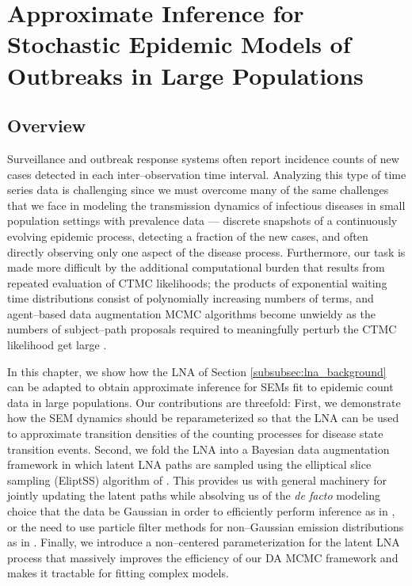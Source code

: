 \chapter{Approximate Inference for Stochastic Epidemic Models of Outbreaks in Large Populations}
\label{chap:lna_for_sems}

\section{Overview}
\label{sec:lna_overview}

Surveillance and outbreak response systems often report incidence counts of new cases detected in each inter--observation time interval. Analyzing this type of time series data is challenging since we must overcome many of the same challenges that we face in modeling the transmission dynamics of infectious diseases in small population settings with prevalence data --- discrete snapshots of a continuously evolving epidemic process, detecting a fraction of the new cases, and often directly observing only one aspect of the disease process. Furthermore, our task is made more difficult by the additional computational burden that results from repeated evaluation of CTMC likelihoods; the products of exponential waiting time distributions consist of polynomially increasing numbers of terms, and agent--based data augmentation MCMC algorithms become unwieldy as the numbers of subject--path proposals required to meaningfully perturb the CTMC likelihood get large \citep{fintzi2017efficient}. 

In this chapter, we show how the LNA of Section \ref{subsubsec:lna_background} can be adapted to obtain approximate inference for SEMs fit to epidemic count data in large populations. Our contributions are threefold: First, we demonstrate how the SEM dynamics should be reparameterized so that the LNA can be used to approximate transition densities of the counting processes for disease state transition events. Second, we fold the LNA into a Bayesian data augmentation framework in which latent LNA paths are sampled using the elliptical slice sampling (EliptSS) algorithm of \cite{murray2010}. This provides us with general machinery for jointly updating the latent paths while absolving us of the \textit{de facto} modeling choice that the data be Gaussian in order to efficiently perform inference as in \cite{komorowski2009,fearnhead2014}, or the need to use particle filter methods for non--Gaussian emission distributions as in \cite{golightly2015delayed}. Finally, we introduce a non--centered parameterization for the latent LNA process that massively improves the efficiency of our DA MCMC framework and makes it tractable for fitting complex models. 

